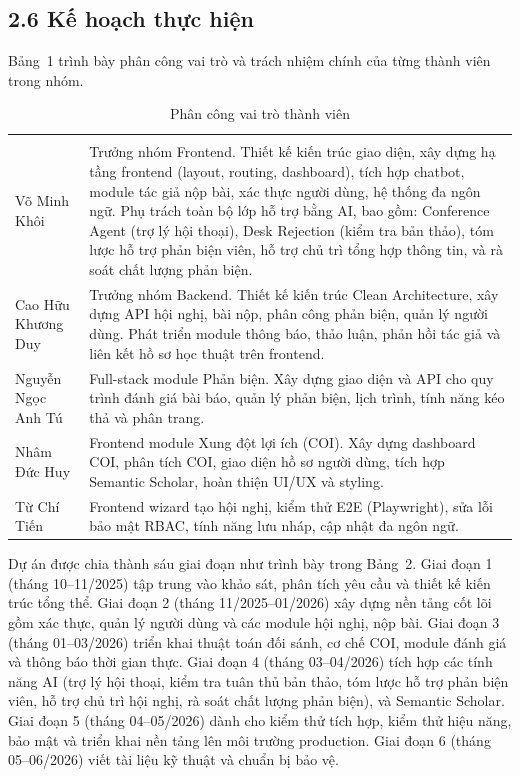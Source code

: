 \subsection*{2.6 Kế hoạch thực hiện}

Bảng~1 trình bày phân công vai trò và trách nhiệm chính của từng thành viên trong nhóm.

\begingroup
\setlength{\tabcolsep}{4pt}
\begin{longtable}{|T{0.22\textwidth}|T{0.70\textwidth}|}
  \caption{Phân công vai trò thành viên}\label{tab:proposal-roles}\\[0.5\baselineskip]
  \hline
   &  \\ \hline
  \endfirsthead
  \hline
   &  \\ \hline
  \endhead
  \hline
  \endfoot
  Võ Minh Khôi & Trưởng nhóm Frontend. Thiết kế kiến trúc giao diện, xây dựng hạ tầng frontend (layout, routing, dashboard), tích hợp chatbot, module tác giả nộp bài, xác thực người dùng, hệ thống đa ngôn ngữ. Phụ trách toàn bộ lớp hỗ trợ bằng AI, bao gồm: Conference Agent (trợ lý hội thoại), Desk Rejection (kiểm tra bản thảo), tóm lược hỗ trợ phản biện viên, hỗ trợ chủ trì tổng hợp thông tin, và rà soát chất lượng phản biện. \\ \hline
  Cao Hữu Khương Duy & Trưởng nhóm Backend. Thiết kế kiến trúc Clean Architecture, xây dựng API hội nghị, bài nộp, phân công phản biện, quản lý người dùng. Phát triển module thông báo, thảo luận, phản hồi tác giả và liên kết hồ sơ học thuật trên frontend. \\ \hline
  Nguyễn Ngọc Anh Tú & Full-stack module Phản biện. Xây dựng giao diện và API cho quy trình đánh giá bài báo, quản lý phản biện, lịch trình, tính năng kéo thả và phân trang. \\ \hline
  Nhâm Đức Huy & Frontend module Xung đột lợi ích (COI). Xây dựng dashboard COI, phân tích COI, giao diện hồ sơ người dùng, tích hợp Semantic Scholar, hoàn thiện UI/UX và styling. \\ \hline
  Từ Chí Tiến & Frontend wizard tạo hội nghị, kiểm thử E2E (Playwright), sửa lỗi bảo mật RBAC, tính năng lưu nháp, cập nhật đa ngôn ngữ. \\ \hline
\end{longtable}
\endgroup

Dự án được chia thành sáu giai đoạn như trình bày trong Bảng~2. Giai đoạn 1 (tháng 10--11/2025) tập trung vào khảo sát, phân tích yêu cầu và thiết kế kiến trúc tổng thể. Giai đoạn 2 (tháng 11/2025--01/2026) xây dựng nền tảng cốt lõi gồm xác thực, quản lý người dùng và các module hội nghị, nộp bài. Giai đoạn 3 (tháng 01--03/2026) triển khai thuật toán đối sánh, cơ chế COI, module đánh giá và thông báo thời gian thực. Giai đoạn 4 (tháng 03--04/2026) tích hợp các tính năng AI (trợ lý hội thoại, kiểm tra tuân thủ bản thảo, tóm lược hỗ trợ phản biện viên, hỗ trợ chủ trì hội nghị, rà soát chất lượng phản biện), và Semantic Scholar. Giai đoạn 5 (tháng 04--05/2026) dành cho kiểm thử tích hợp, kiểm thử hiệu năng, bảo mật và triển khai nền tảng lên môi trường production. Giai đoạn 6 (tháng 05--06/2026) viết tài liệu kỹ thuật và chuẩn bị bảo vệ.

